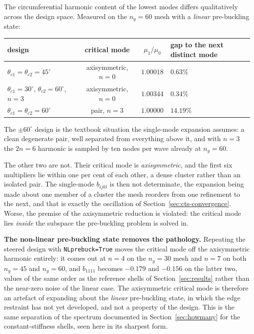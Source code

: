 \documentclass[11pt,a4paper]{article}
\begin{document}
The circumferential harmonic content of the lowest modes differs
qualitatively across the design space.  Measured on the $n_y = 60$ mesh with
a \emph{linear} pre-buckling state:

\begin{center}
\begin{tabular}{lccl}
\toprule
design & critical mode & $\mu_1/\mu_0$ & gap to the next distinct mode \\
\midrule
$\theta_{c1}=\theta_{c2}=45^\circ$ & axisymmetric, $n=0$ & $1.00018$ & $0.63\%$ \\
$\theta_{c1}=30^\circ$, $\theta_{c2}=60^\circ$, $n{=}3$
                                   & axisymmetric, $n=0$ & $1.00344$ & $0.34\%$ \\
$\theta_{c1}=\theta_{c2}=60^\circ$ & pair, $n=3$         & $1.00000$ & $14.19\%$ \\
\bottomrule
\end{tabular}
\end{center}

The $\pm60^\circ$ design is the textbook situation the single-mode expansion
assumes: a clean degenerate pair, well separated from everything above it, and
with $n = 3$ the $2n = 6$ harmonic is sampled by ten nodes per wave already at
$n_y = 60$.

The other two are not.  Their critical mode is \emph{axisymmetric}, and the
first six multipliers lie within one per cent of each other, a dense cluster
rather than an isolated pair.  The single-mode $b_{ijkl}$ is then not
determinate, the expansion being made about one member of a cluster the mesh
reorders from one refinement to the next, and that is exactly the
oscillation of Section~\ref{sec:cts-convergence}.  Worse, the premise of the
axisymmetric reduction is violated: the critical mode lies \emph{inside} the
subspace the pre-buckling problem is solved in.

\medskip
\noindent
\textbf{The non-linear pre-buckling state removes the pathology.}  Repeating
the steered design with \texttt{NLprebuck=True} moves the critical mode off
the axisymmetric harmonic entirely: it comes out at $n = 4$ on the
$n_y = 30$ mesh and $n = 7$ on both $n_y = 45$ and $n_y = 60$, and
$b_{1111}$ becomes $-0.179$ and $-0.156$ on the latter two, values of the
same order as the reference shells of Section~\ref{sec:results} rather than
the near-zero noise of the linear case.  The axisymmetric critical mode is
therefore an artefact of expanding about the \emph{linear} pre-buckling
state, in which the edge restraint has not yet developed, and not a property
of the design.  This is the same separation of the spectrum documented in
Section~\ref{sec:howmany} for the constant-stiffness shells, seen here in its
sharpest form.
\end{document}
